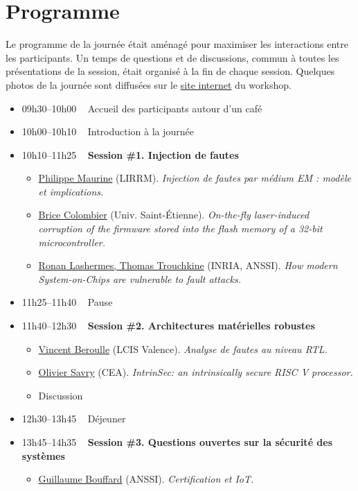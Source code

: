 \documentclass[a4paper,11pt]{article}
\begin{document}
\section{Programme}
\label{sec:org23736f2}
Le programme de la journée était aménagé pour maximiser les
interactions entre les participants.  Un temps de questions et de
discussions, commun à toutes les présentations de la session, était
organisé à la fin de chaque session.
Quelques photos de la journée sont diffusées sur le \href{https://jaif2019.github.io/photos.html}{site
internet} du workshop.

\begin{itemize}
\item 09h30--10h00   Accueil des participants autour d’un café
\item 10h00--10h10   Introduction à la journée
\item 10h10--11h25   \textbf{Session \#1. Injection de fautes}
\begin{itemize}
\item \hyperref[sec:orgdcb5910]{Philippe Maurine} (LIRRM). \emph{Injection de fautes par médium EM : modèle et implications.}
\item \hyperref[sec:orga260102]{Brice Colombier} (Univ. Saint-Étienne). \emph{On-the-fly laser-induced corruption of the firmware stored into the flash memory of a 32-bit microcontroller.}
\item \hyperref[sec:orgc4c5702]{Ronan Lashermes, Thomas Trouchkine} (INRIA, ANSSI). \emph{How modern System-on-Chips are vulnerable to fault attacks.}
\end{itemize}
\item 11h25--11h40   Pause
\item 11h40--12h30   \textbf{Session \#2. Architectures matérielles robustes}
\begin{itemize}
\item \hyperref[sec:org411958b]{Vincent Beroulle} (LCIS Valence). \emph{Analyse de fautes au niveau RTL.}
\item \hyperref[sec:org05922c6]{Olivier Savry} (CEA). \emph{IntrinSec: an intrinsically secure RISC V processor.}
\item Discussion
\end{itemize}
\item 12h30--13h45   Déjeuner
\item 13h45--14h35   \textbf{Session \#3. Questions ouvertes sur la sécurité des systèmes}
\begin{itemize}
\item \hyperref[sec:org2f6ee07]{Guillaume Bouffard} (ANSSI). \emph{Certification et IoT.}

\end{itemize}
\end{itemize}
\end{document}

